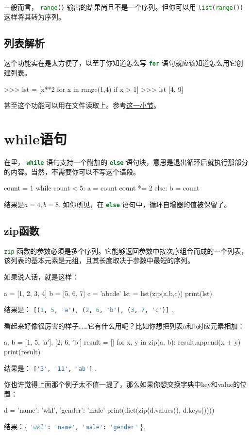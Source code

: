 \documentclass[a4paper,12pt]{report}
\newcommand{\pyline}[1]{{ \lstinline[language=Python, basicstyle=\ttfamily]{#1} }}
\newcommand{\python}{{\ttfamily{Python}}}
\begin{document}
一般而言，\pyline{range()}输出的结果尚且不是一个序列。但你可以用\pyline{list(range())}这样将其转为序列。

\subsection{列表解析}
这个功能实在是太方便了，以至于你知道怎么写\pyline{for}语句就应该知道怎么用它创建列表。
\begin{py}
>>> lst = [x**2 for x in range(1,4) if x > 1]
>>> lst
[4, 9]
\end{py}

甚至这个功能可以用在文件读取上。参考\hyperref[sec:liebiaojiexi]{这一小节}。

\section{while语句}
在\python 里，\pyline{while}语句支持一个附加的\pyline{else}语句块，意思是退出循环后就执行那部分的内容。当然，不需要你可以不写这个语段。

\begin{py}
count = 1
while count < 5:
    a = count
    count *= 2
else:
    b = count
\end{py}
结果是$a=4, b=8$. 如你所见，在\pyline{else}语句中，循环自增器的值被保留了。

\subsection{zip函数}
\label{sec:zip}
\pyline{zip}函数的参数必须是多个序列。它能够返回参数中按次序组合而成的一个列表，该列表的基本元素是元组，且其长度取决于参数中最短的序列。

如果说人话，就是这样：
\begin{py}
a = [1, 2, 3, 4]
b = [5, 6, 7]
c = 'abcde'
lst = list(zip(a,b,c))
print(lst)
\end{py}
结果是：\pyline{[(1, 5, 'a'), (2, 6, 'b'), (3, 7, 'c')]}. 

看起来好像很厉害的样子……它有什么用呢？比如你想把列表a和b对应元素相加：
\begin{py}
a, b = [1, 5, 'a'], [2, 6, 'b']
result = []
for x, y in zip(a, b):
    result.append(x + y)
print(result)
\end{py}
结果是：\pyline{['3', '11', 'ab']}. 

你也许觉得上面那个例子太不值一提了，那么如果你想交换字典中key和value的位置：
\begin{py}
d = {'name': 'wkl', 'gender': 'male'}
print(dict(zip(d.values(), d.keys())))
\end{py}
结果：\{\pyline{'wkl': 'name', 'male': 'gender'}\}. 
\end{document}
